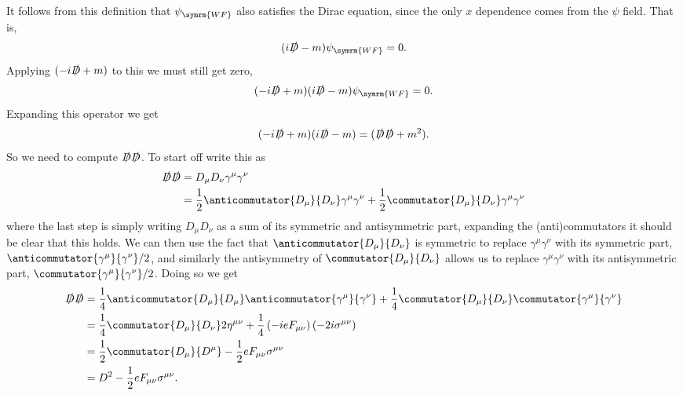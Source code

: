 \documentclass[fleqn]{NotesClass}
\newcommand{\covariantDerivative}{D}
\newcommand{\minkowskiMetric}{\eta}
\begin{document}
    It follows from this definition that \(\psi_{\symrm{WF}}\) also satisfies the Dirac equation, since the only \(x\) dependence comes from the \(\psi\) field.
    That is,
    \begin{equation}
        (i\slashed{\covariantDerivative} - m)\psi_{\symrm{WF}} = 0.
    \end{equation}
    Applying \((-i\slashed{\covariantDerivative} + m)\) to this we must still get zero,
    \begin{equation}
        (-i\slashed{\covariantDerivative} + m)(i\slashed{\covariantDerivative} - m)\psi_{\symrm{WF}} = 0.
    \end{equation}
    Expanding this operator we get
    \begin{equation}
        (-i\slashed{\covariantDerivative} + m)(i\slashed{\covariantDerivative} - m) = (\slashed{\covariantDerivative}\slashed{\covariantDerivative} + m^2).
    \end{equation}
    So we need to compute \(\slashed{\covariantDerivative}\slashed{\covariantDerivative}\).
    To start off write this as
    \begin{align}
        \slashed{\covariantDerivative}\slashed{\covariantDerivative} &= \covariantDerivative_\mu \covariantDerivative_\nu \gamma^\mu \gamma^\nu\\
        &= \frac{1}{2}\anticommutator{\covariantDerivative_\mu}{\covariantDerivative_\nu}\gamma^\mu \gamma^\nu + \frac{1}{2}\commutator{\covariantDerivative_\mu}{\covariantDerivative_\nu}\gamma^\mu \gamma^\nu
    \end{align}
    where the last step is simply writing \(\covariantDerivative_\mu \covariantDerivative_\nu\) as a sum of its symmetric and antisymmetric part, expanding the (anti)commutators it should be clear that this holds.
    We can then use the fact that \(\anticommutator{\covariantDerivative_\mu}{\covariantDerivative_\nu}\) is symmetric to replace \(\gamma^\mu\gamma^\nu\) with its symmetric part, \(\anticommutator{\gamma^\mu}{\gamma^\nu}/2\), and similarly the antisymmetry of \(\commutator{\covariantDerivative_\mu}{\covariantDerivative_\nu}\) allows us to replace \(\gamma^\mu\gamma^\nu\) with its antisymmetric part, \(\commutator{\gamma^\mu}{\gamma^\nu}/2\).
    Doing so we get
    \begin{align}
        \slashed{\covariantDerivative}\slashed{\covariantDerivative} &= \frac{1}{4}\anticommutator{\covariantDerivative_\mu}{\covariantDerivative_\mu} \anticommutator{\gamma^\mu}{\gamma^\nu} + \frac{1}{4}\commutator{\covariantDerivative_\mu}{\covariantDerivative_\nu} \commutator{\gamma^\mu}{\gamma^\nu}\\
        &= \frac{1}{4}\commutator{\covariantDerivative_\mu}{\covariantDerivative_\nu} 2\minkowskiMetric^{\mu\nu} + \frac{1}{4}\left( -ieF_{\mu\nu} \right) ( -2i\sigma^{\mu\nu} )\\
        &= \frac{1}{2} \commutator{\covariantDerivative_\mu}{\covariantDerivative^\mu} - \frac{1}{2}eF_{\mu\nu} \sigma^{\mu\nu}\\
        &= \covariantDerivative^2 - \frac{1}{2}eF_{\mu\nu} \sigma^{\mu\nu}.
    \end{align}
\end{document}

